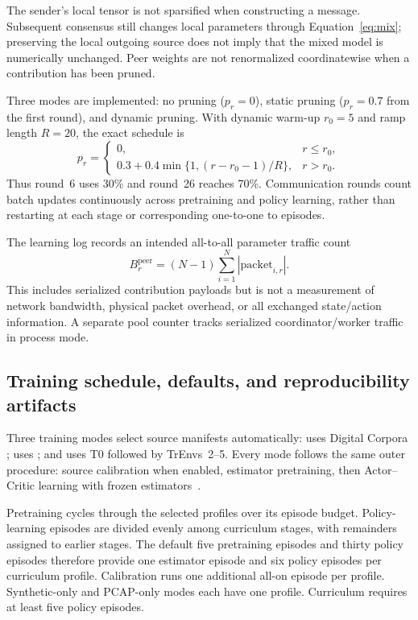 \documentclass[11pt,a4paper]{article}
\newcommand{\code}[1]{\texttt{\detokenize{#1}}}
\begin{document}
The sender's local tensor is not sparsified when constructing a message.
Subsequent consensus still changes local parameters through
Equation~\eqref{eq:mix}; preserving the local outgoing source does not imply
that the mixed model is numerically unchanged. Peer weights are not renormalized
coordinatewise when a contribution has been pruned.

Three modes are implemented: no pruning ($p_r=0$), static pruning ($p_r=0.7$
from the first round), and dynamic pruning. With dynamic warm-up $r_0=5$ and
ramp length $R=20$, the exact schedule is
\begin{equation}
 p_r=\begin{cases}
 0, & r\leq r_0,\\
 0.3+0.4\min\{1,(r-r_0-1)/R\}, & r>r_0.
 \end{cases}
 \label{eq:pruning}
\end{equation}
Thus round~6 uses 30\% and round~26 reaches 70\%. Communication rounds count
batch updates continuously across pretraining and policy learning, rather
than restarting at each stage or corresponding one-to-one to episodes.

The learning log records an intended all-to-all parameter traffic count
\begin{equation}
 B_r^{\mathrm{peer}}=(N-1)\sum_{i=1}^{N}|\mathrm{packet}_{i,r}|.
\end{equation}
This includes serialized contribution payloads but is not a measurement of
network bandwidth, physical packet overhead, or all exchanged state/action
information. A separate pool counter tracks serialized coordinator/worker
traffic in process mode.

\subsection{Training schedule, defaults, and reproducibility artifacts}
\label{sec:training}

Three training modes select source manifests automatically: \code{synthetic}
uses Digital Corpora \code{dc_t0}; \code{pcaps} uses \code{dc_pcap}; and
\code{curriculum} uses T0 followed by TrEnvs~2--5. Every mode follows the same
outer procedure: source calibration when enabled, estimator pretraining,
then Actor--Critic learning with frozen estimators~\cite{code-training}.

Pretraining cycles through the selected profiles over its episode budget.
Policy-learning episodes are divided evenly among curriculum stages, with
remainders assigned to earlier stages. The default five pretraining episodes
and thirty policy episodes therefore provide one estimator episode and six
policy episodes per curriculum profile. Calibration runs one additional
all-on episode per profile. Synthetic-only and PCAP-only modes each have one
profile. Curriculum requires at least five policy episodes.
\end{document}
